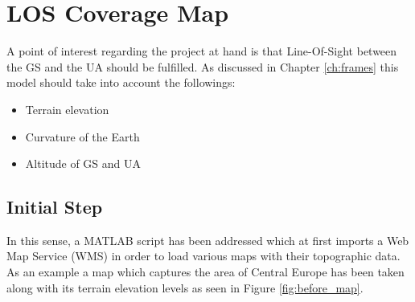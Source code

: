 \section{LOS Coverage Map}\label{sec:los_map}
A point of interest regarding the project at hand is that Line-Of-Sight between the GS and the UA should be fulfilled. As discussed in Chapter \ref{ch:frames} this model should take into account the followings:

\begin{itemize}
	\item Terrain elevation
	\item Curvature of the Earth
	\item Altitude of GS and UA
\end{itemize}

\subsection{Initial Step}
In this sense, a MATLAB script has been addressed which at first imports a Web Map Service (WMS) in order to load various maps with their topographic data. As an example a map which captures the area of Central Europe has been taken along with its terrain elevation levels as seen in Figure \ref{fig:before_map}.


